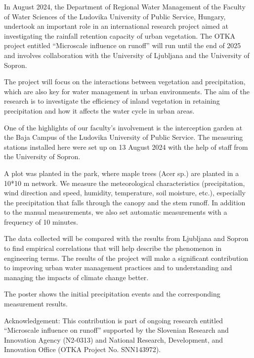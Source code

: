 \noindent

In August 2024, the Department of Regional Water Management of the Faculty of Water Sciences of the Ludovika University of Public Service, Hungary, undertook an important role in an international research project aimed at investigating the rainfall retention capacity of urban vegetation. The OTKA project entitled “Microscale influence on runoff” will run until the end of 2025 and involves collaboration with the University of Ljubljana and the University of Sopron.

The project will focus on the interactions between vegetation and precipitation, which are also key for water management in urban environments. The aim of the research is to investigate the efficiency of inland vegetation in retaining precipitation and how it affects the water cycle in urban areas.

One of the highlights of our faculty's involvement is the interception garden at the Baja Campus of the Ludovika University of Public Service. The measuring stations installed here were set up on 13 August 2024 with the help of staff from the University of Sopron. 

A plot was planted in the park, where maple trees (Acer sp.) are planted in a 10*10 m network. We measure the meteorological characteristics (precipitation, wind direction and speed, humidity, temperature, soil moisture, etc.), especially the precipitation that falls through the canopy and the stem runoff. In addition to the manual measurements, we also set automatic measurements with a frequency of 10 minutes.

The data collected will be compared with the results from Ljubljana and Sopron to find empirical correlations that will help describe the phenomenon in engineering terms. The results of the project will make a significant contribution to improving urban water management practices and to understanding and managing the impacts of climate change better.

The poster shows the initial precipitation events and the corresponding measurement results.

Acknowledgement: This contribution is part of ongoing research entitled “Microscale influence on runoff” supported by the Slovenian Research and Innovation Agency (N2-0313) and National Research, Development, and Innovation Office (OTKA Project No. SNN143972).  

